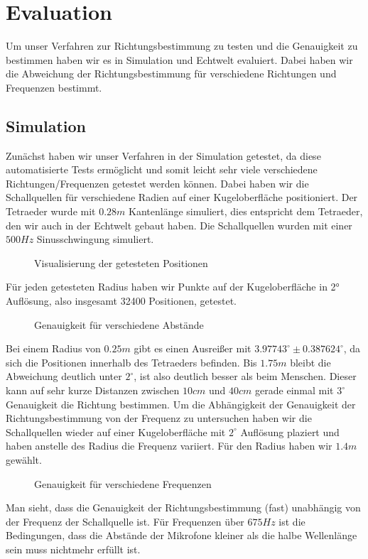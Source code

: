 \section{Evaluation} 
Um unser Verfahren zur Richtungsbestimmung zu testen und die Genauigkeit zu bestimmen haben wir es in Simulation und Echtwelt evaluiert. Dabei haben wir die Abweichung der Richtungsbestimmung für verschiedene Richtungen und Frequenzen bestimmt.
\subsection{Simulation}
Zunächst haben wir unser Verfahren in der Simulation getestet, da diese automatisierte Tests ermöglicht und somit leicht sehr viele verschiedene Richtungen/Frequenzen getestet werden können. Dabei haben wir die Schallquellen für verschiedene Radien auf einer Kugeloberfläche positioniert. Der Tetraeder wurde mit $0.28m$ Kantenlänge simuliert, dies entspricht dem Tetraeder, den wir auch in der Echtwelt gebaut haben. Die Schallquellen wurden mit einer $500Hz$ Sinusschwingung simuliert.
\begin{figure}[H]
  \centering
  
  \caption{Visualisierung der getesteten Positionen}
  \label{fig:pos}
\end{figure}
Für jeden getesteten Radius haben wir Punkte auf der Kugeloberfläche in 2° Auflösung, also insgesamt 32400 Positionen, getestet.
\begin{figure}[H]
  \centering
  
  \caption{Genauigkeit für verschiedene Abstände}
  \label{fig:pos_sweep}
\end{figure}
Bei einem Radius von $0.25m$ gibt es einen Ausreißer mit $3.97743^\circ \pm 0.387624^\circ$, da sich die Positionen innerhalb des Tetraeders befinden. Bis $1.75m$ bleibt die Abweichung deutlich unter $2^\circ$, ist also deutlich besser als beim Menschen. Dieser kann auf sehr kurze Distanzen zwischen $10cm$ und $40cm$ gerade einmal mit $3^\circ$ Genauigkeit die Richtung bestimmen.
Um die Abhängigkeit der Genauigkeit der Richtungsbestimmung von der Frequenz zu untersuchen haben wir die Schallquellen wieder auf einer Kugeloberfläche mit $2^\circ$ Auflösung plaziert und haben anstelle des Radius die Frequenz variiert. Für den Radius haben wir $1.4m$ gewählt.
\begin{figure}[H]
  \centering
  
  \caption{Genauigkeit für verschiedene Frequenzen}
  \label{fig:freq_seep}
\end{figure}
Man sieht, dass die Genauigkeit der Richtungsbestimmung (fast) unabhängig von der Frequenz der Schallquelle ist. Für Frequenzen über $675Hz$ ist die Bedingungen, dass die Abstände der Mikrofone kleiner als die halbe Wellenlänge sein muss nichtmehr erfüllt ist.
